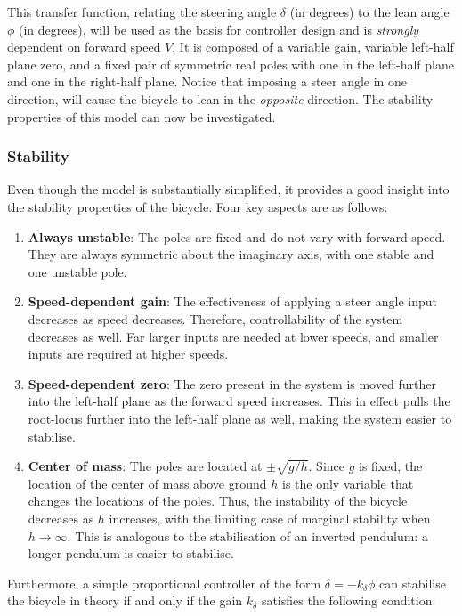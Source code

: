 This transfer function, relating the steering angle $\delta$ (in degrees) to the lean angle $\phi$ (in degrees), will be used as the basis for controller design and is \textit{strongly} dependent on forward speed $V$. It is composed of a variable gain, variable left-half plane zero, and a fixed pair of symmetric real poles with one in the left-half plane and one in the right-half plane. Notice that imposing a steer angle in one direction, will cause the bicycle to lean in the \textit{opposite} direction. The stability properties of this model can now be investigated. 

\subsubsection{Stability}
Even though the model is substantially simplified, it provides a good insight into the stability properties of the bicycle. Four key aspects are as follows:

\begin{enumerate}
\item{\textbf{Always unstable}: The poles are fixed and do not vary with forward speed. They are always symmetric about the imaginary axis, with one stable and one unstable pole.}
\item{\textbf{Speed-dependent gain}: The effectiveness of applying a steer angle input decreases as speed decreases. Therefore, controllability of the system decreases as well. Far larger inputs are needed at lower speeds, and smaller inputs are required at higher speeds.}
\item{\textbf{Speed-dependent zero}: The zero present in the system is moved further into the left-half plane as the forward speed increases. This in effect pulls the root-locus further into the left-half plane as well, making the system easier to stabilise.}
\item{\textbf{Center of mass}: The poles are located at $\pm \sqrt{g/h}$. Since $g$ is fixed, the location of the center of mass above ground $h$ is the only variable that changes the locations of the poles. Thus, the instability of the bicycle decreases as $h$ increases, with the limiting case of marginal stability when $h \rightarrow \infty$. This is analogous to the stabilisation of an inverted pendulum: a longer pendulum is easier to stabilise.}
\end{enumerate}

Furthermore, a simple proportional controller of the form $\delta=-k_{\delta} \phi$ can stabilise the bicycle in theory if and only if the gain $k_{\delta}$ satisfies the following condition:

